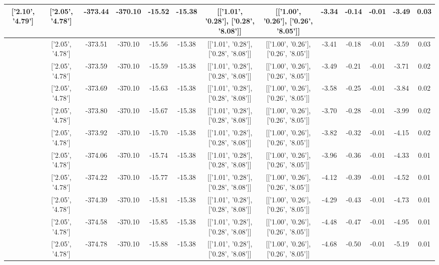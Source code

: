 \begin{table}[htbp]
\begin{adjustbox}{angle=90}
\begin{tabular}{|c|c|c|c|c|c|c|c|c|c|c|c|c|}
 ['2.10', '4.79'] & ['2.05', '4.78'] & -373.44 & -370.10 & -15.52 & -15.38 & [['1.01', '0.28'], ['0.28', '8.08']] & [['1.00', '0.26'], ['0.26', '8.05']] & -3.34 & -0.14 & -0.01 & -3.49 & 0.03\\ \hline
 ['2.11', '4.79'] & ['2.05', '4.78'] & -373.51 & -370.10 & -15.56 & -15.38 & [['1.01', '0.28'], ['0.28', '8.08']] & [['1.00', '0.26'], ['0.26', '8.05']] & -3.41 & -0.18 & -0.01 & -3.59 & 0.03\\ \hline
 ['2.12', '4.80'] & ['2.05', '4.78'] & -373.59 & -370.10 & -15.59 & -15.38 & [['1.01', '0.28'], ['0.28', '8.08']] & [['1.00', '0.26'], ['0.26', '8.05']] & -3.49 & -0.21 & -0.01 & -3.71 & 0.02\\ \hline
 ['2.13', '4.80'] & ['2.05', '4.78'] & -373.69 & -370.10 & -15.63 & -15.38 & [['1.01', '0.28'], ['0.28', '8.08']] & [['1.00', '0.26'], ['0.26', '8.05']] & -3.58 & -0.25 & -0.01 & -3.84 & 0.02\\ \hline
 ['2.14', '4.80'] & ['2.05', '4.78'] & -373.80 & -370.10 & -15.67 & -15.38 & [['1.01', '0.28'], ['0.28', '8.08']] & [['1.00', '0.26'], ['0.26', '8.05']] & -3.70 & -0.28 & -0.01 & -3.99 & 0.02\\ \hline
 ['2.16', '4.80'] & ['2.05', '4.78'] & -373.92 & -370.10 & -15.70 & -15.38 & [['1.01', '0.28'], ['0.28', '8.08']] & [['1.00', '0.26'], ['0.26', '8.05']] & -3.82 & -0.32 & -0.01 & -4.15 & 0.02\\ \hline
 ['2.17', '4.81'] & ['2.05', '4.78'] & -374.06 & -370.10 & -15.74 & -15.38 & [['1.01', '0.28'], ['0.28', '8.08']] & [['1.00', '0.26'], ['0.26', '8.05']] & -3.96 & -0.36 & -0.01 & -4.33 & 0.01\\ \hline
 ['2.18', '4.81'] & ['2.05', '4.78'] & -374.22 & -370.10 & -15.77 & -15.38 & [['1.01', '0.28'], ['0.28', '8.08']] & [['1.00', '0.26'], ['0.26', '8.05']] & -4.12 & -0.39 & -0.01 & -4.52 & 0.01\\ \hline
 ['2.19', '4.81'] & ['2.05', '4.78'] & -374.39 & -370.10 & -15.81 & -15.38 & [['1.01', '0.28'], ['0.28', '8.08']] & [['1.00', '0.26'], ['0.26', '8.05']] & -4.29 & -0.43 & -0.01 & -4.73 & 0.01\\ \hline
 ['2.20', '4.81'] & ['2.05', '4.78'] & -374.58 & -370.10 & -15.85 & -15.38 & [['1.01', '0.28'], ['0.28', '8.08']] & [['1.00', '0.26'], ['0.26', '8.05']] & -4.48 & -0.47 & -0.01 & -4.95 & 0.01\\ \hline
 ['2.21', '4.82'] & ['2.05', '4.78'] & -374.78 & -370.10 & -15.88 & -15.38 & [['1.01', '0.28'], ['0.28', '8.08']] & [['1.00', '0.26'], ['0.26', '8.05']] & -4.68 & -0.50 & -0.01 & -5.19 & 0.01\\ \hline

\end{tabular}
\end{adjustbox}
\end{table}
